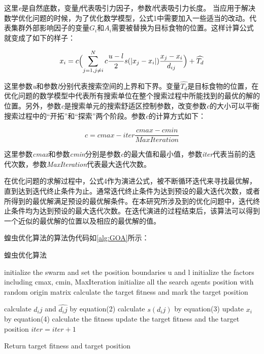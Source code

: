 这里\emph{e}是自然底数，变量\emph{f}代表吸引力因子，参数\emph{l}代表吸引力长度。
当应用于解决数学优化问题的时候，为了优化数学模型，公式1中需要加入一些适当的改动。代表集群外部影响因子的变量$G_i$和$A_i$需要被替换为目标食物的位置。这样计算公式就变成了如下的样子：

\begin{equation}
    x_i = c \Bigl(\sum_{j=1,j\neq{i}}^N c \frac{u-l}{2}s (\lvert x_j-x_i \rvert )\frac{x_j-x_i}{d_{ij}} \Bigr) + \widehat{T_d}
\end{equation}

这里参数\emph{u}和参数\emph{l}分别代表搜索空间的上界和下界。变量$\widehat{T_d}$是目标食物的位置，在优化问题的数学模型中代表所有搜索单位在整个搜索过程中所能找到的最优的解的位置。另外，参数\emph{c}是搜索单元的搜索舒适区控制参数，改变参数\emph{c}的大小可以平衡搜索过程中的“开拓”和“探索”两个阶段。参数\emph{c}的计算方式如下：

\begin{equation}
    c = cmax - iter \frac{cmax - cmin}{MaxIteration}
\end{equation}


这里参数\emph{cmax}和参数\emph{cmin}分别是参数\emph{c}的最大值和最小值，参数\emph{iter}代表当前的迭代次数，参数\emph{MaxIteration}代表最大迭代次数。

在优化问题的求解过程中，公式4作为演进公式，被不断循环迭代来寻找最优解，直到达到迭代终止条件为止。通常迭代终止条件为达到预设的最大迭代次数，或者所得到的最优解满足预设的最优解条件。在本研究所涉及到的优化问题中，迭代终止条件均为达到预设的最大迭代次数。在迭代演进的过程结束后，该算法可以得到一个近似的最优解的位置以及相应的最优解的值。

蝗虫优化算法的算法伪代码如\ref{alg:GOA}所示：
\begin{algorithm}

    \caption{蝗虫优化算法}
    \label{alg:GOA}
    
    \begin{algorithmic}[1]
    \State initialize the swarm and set the position boundaries u and l
    \State initialize the factors including cmax, cmin, MaxIteration
    \State initialize all the search agents position with random origin matrix 
    \State calculate the target fitness and mark the target position
    
    \State calculate $d_ij$ and $\widehat{d_ij}$ by equation(2)
    \State calculate $s(d_ij)$ by equation(3)
    \State update $x_i$ by equation(4)
    \State calculate the fitness 
        \State update the target fitness and the target position
    \EndIf
    \State $iter = iter +1$
     
    \EndWhile

    \State Return target fitness and target position
    
    
    \end{algorithmic}
    
\end{algorithm}

